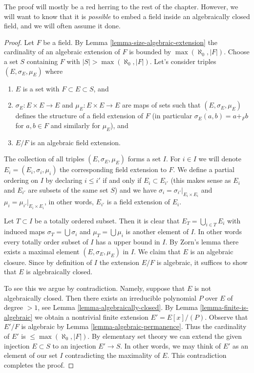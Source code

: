 \noindent
The proof will mostly be a red herring to the rest of the chapter. However, we
will want to know that it is {\it possible} to embed a field inside an
algebraically closed field, and we will often assume it done.

\begin{proof}
Let $F$ be a field. By Lemma \ref{lemma-size-algebraic-extension} the
cardinality of an algebraic extension of $F$ is bounded by
$\max(\aleph_0, |F|)$. Choose a set $S$ containing $F$ with
$|S| > \max(\aleph_0, |F|)$. Let's consider triples
$(E, \sigma_E, \mu_E)$ where
\begin{enumerate}
\item $E$ is a set with $F \subset E \subset S$, and
\item $\sigma_E : E \times E \to E$ and $\mu_E : E \times E \to E$
are maps of sets such that $(E, \sigma_E, \mu_E)$ defines the structure
of a field extension of $F$ (in particular $\sigma_E(a, b) = a +_F b$
for $a, b \in F$ and similarly for $\mu_E$), and
\item $E/F$ is an algebraic field extension.
\end{enumerate}
The collection of all triples $(E, \sigma_E, \mu_E)$ forms a set $I$.
For $i \in I$ we will denote $E_i = (E_i, \sigma_i, \mu_i)$ the
corresponding field extension to $F$. We define a partial ordering on
$I$ by declaring $i \leq i'$ if and only if $E_i \subset E_{i'}$
(this makes sense as $E_i$ and $E_{i'}$ are subsets of the same set $S$)
and we have $\sigma_i = \sigma_{i'}|_{E_i \times E_i}$ and
$\mu_i = \mu_{i'}|_{E_i \times E_i}$, in other words, $E_{i'}$ is a field
extension of $E_i$.

\medskip\noindent
Let $T \subset I$ be a totally ordered subset. Then it is clear that
$E_T = \bigcup_{i \in T} E_i$ with induced maps $\sigma_T = \bigcup \sigma_i$
and $\mu_T = \bigcup \mu_i$ is another element of $I$. In other words
every totally order subset of $I$ has a upper bound in $I$. By Zorn's lemma
there exists a maximal element $(E, \sigma_E, \mu_E)$ in $I$. We claim that
$E$ is an algebraic closure. Since by definition of $I$ the extension
$E/F$ is algebraic, it suffices to show that $E$ is algebraically closed.

\medskip\noindent
To see this we argue by contradiction. Namely, suppose that $E$ is not
algebraically closed. Then there exists an irreducible polynomial
$P$ over $E$ of degree $> 1$, see Lemma \ref{lemma-algebraically-closed}.
By Lemma \ref{lemma-finite-is-algebraic} we obtain a nontrivial finite
extension $E' = E[x]/(P)$. Observe that $E'/F$ is algebraic by
Lemma \ref{lemma-algebraic-permanence}.
Thus the cardinality of $E'$ is $\leq \max(\aleph_0, |F|)$.
By elementary set theory we can extend the given injection
$E \subset S$ to an injection $E' \to S$. In other words, we may
think of $E'$ as an element of our set $I$ contradicting the
maximality of $E$. This contradiction completes the proof.
\end{proof}

